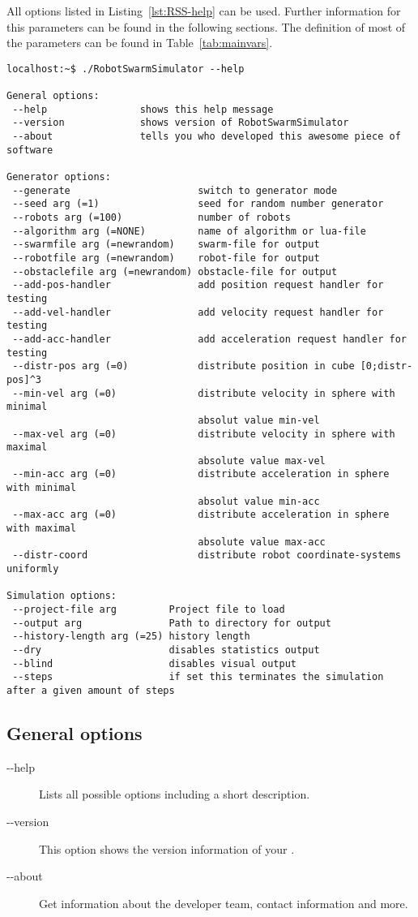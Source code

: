 All options listed in Listing~\ref{lst:RSS-help} can be used. Further information for this parameters can be found in the following sections. The definition of most of the parameters can be found in Table~\ref{tab:mainvars}.

\begin{lstlisting}[caption={\RSS Helpline},label=lst:RSS-help]
localhost:~$ ./RobotSwarmSimulator --help

General options:
 --help                shows this help message
 --version             shows version of RobotSwarmSimulator
 --about               tells you who developed this awesome piece of software

Generator options:
 --generate                      switch to generator mode
 --seed arg (=1)                 seed for random number generator
 --robots arg (=100)             number of robots
 --algorithm arg (=NONE)         name of algorithm or lua-file
 --swarmfile arg (=newrandom)    swarm-file for output
 --robotfile arg (=newrandom)    robot-file for output
 --obstaclefile arg (=newrandom) obstacle-file for output
 --add-pos-handler               add position request handler for testing
 --add-vel-handler               add velocity request handler for testing
 --add-acc-handler               add acceleration request handler for testing
 --distr-pos arg (=0)            distribute position in cube [0;distr-pos]^3
 --min-vel arg (=0)              distribute velocity in sphere with minimal  
                                 absolut value min-vel
 --max-vel arg (=0)              distribute velocity in sphere with maximal
                                 absolute value max-vel
 --min-acc arg (=0)              distribute acceleration in sphere with minimal  
                                 absolut value min-acc
 --max-acc arg (=0)              distribute acceleration in sphere with maximal
                                 absolute value max-acc
 --distr-coord                   distribute robot coordinate-systems uniformly

Simulation options:
 --project-file arg         Project file to load
 --output arg               Path to directory for output
 --history-length arg (=25) history length
 --dry                      disables statistics output
 --blind                    disables visual output
 --steps                    if set this terminates the simulation after a given amount of steps
\end{lstlisting}


\subsection{General options}
\begin{description}
	\item [-{}-help] Lists all possible options including a short description.
	\item [-{}-version] This option shows the version information of your \RSS.
	\item [-{}-about] Get information about the developer team, contact information and more.
\end{description}

